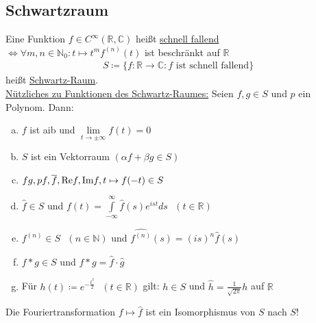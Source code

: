 \subsection{Schwartzraum}
Eine Funktion $f \in C^\infty(\mathbb{R},\mathbb{C})$ heißt \underline{schnell fallend} $\Leftrightarrow \forall m,n \in \mathbb{N}_0: t \mapsto t^mf^{(n)}(t)$ ist beschränkt auf $\mathbb{R}$
\begin{align*}
    S \coloneqq \{ f:\mathbb{R} \to \mathbb{C}: f \text{ ist schnell fallend}\}
\end{align*}
heißt \underline{Schwartz-Raum}. \\
\underline{Nützliches zu Funktionen des Schwartz-Raumes:}
Seien $f,g \in S$ und $p$ ein Polynom. Dann:
\begin{enumerate} [a)]
    \item $f$ ist aib und $\lim \limits_{t \to \pm \infty} f(t) = 0$
    \item $S$ ist ein Vektorraum $(\alpha f + \beta g \in S)$
    \item $fg,pf,\overline{f},\text{Re} f,\text{Im} f,t \mapsto f(-t) \in S$
    \item $\widehat{f} \in S$ und $f(t)= \int \limits_{-\infty}^\infty \widehat{f}(s)e^{ist}ds \text{ } (t \in \mathbb{R})$
    \item $f^{(n)} \in S \text{ } (n \in \mathbb{N})$ und $\widehat{f^{(n)}}(s) = (is)^n \widehat{f}(s)$
    \item $f*g \in S$ und $\widehat{f*g} = \widehat{f} \cdot \widehat{g}$
    \item Für $h(t) \coloneqq e^{-\frac{t^2}{2}} \text{ } (t \in \mathbb{R})$ gilt: $h \in S$ und $\widehat{h}= \frac{1}{\sqrt{2\pi}}h$ auf $\mathbb{R}$
\end{enumerate}
Die Fouriertransformation $f \mapsto \widehat{f}$ ist ein Isomorphismus von $S$ nach $S$!